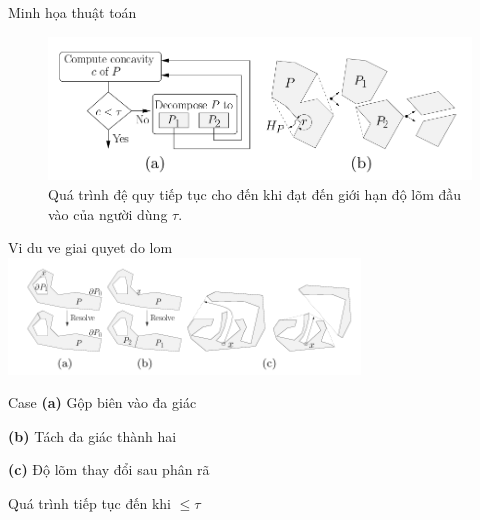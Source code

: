 \documentclass[aspectratio=169]{beamer}
\begin{document}
\begin{frame}{Minh họa thuật toán}
    \begin{figure}
        \centering
        \includegraphics[width=0.8\linewidth]{../imgs/ACD-1.png}
        \caption{Quá trình đệ quy tiếp tục cho đến khi đạt đến giới hạn độ lõm đầu vào của người dùng $\tau$.}
    \end{figure}
\end{frame}

\begin{frame}{Vi du ve giai quyet do lom}
    \centering
    \includegraphics[width=0.7\textwidth]{../imgs/ACD-3.png}

    \begin{block}{Case}
        \textbf{(a)} Gộp biên vào đa giác

        \textbf{(b)} Tách đa giác thành hai

        \textbf{(c)} Độ lõm thay đổi sau phân rã

        \vspace{0.2cm}
        Quá trình tiếp tục đến khi $\leq \tau$
    \end{block}
\end{frame}
\end{document}
